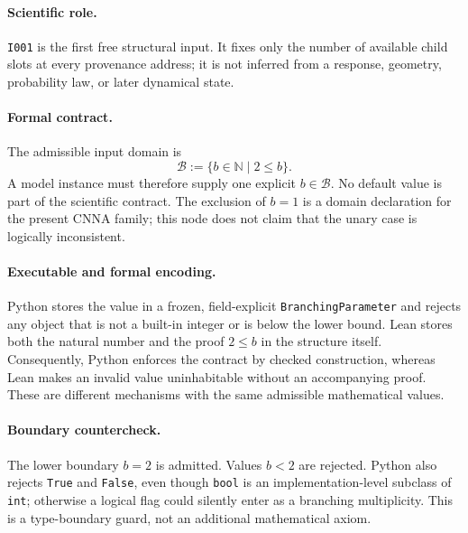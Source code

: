 
\paragraph*{Scientific role.}
\texttt{I001} is the first free structural input.  It fixes only the number of
available child slots at every provenance address; it is not inferred from a
response, geometry, probability law, or later dynamical state.

\paragraph*{Formal contract.}
The admissible input domain is
\begin{equation}
  \mathcal B := \{b\in\mathbb N \mid 2\le b\}.
  \label{eq:i001-branching-domain}
\end{equation}
A model instance must therefore supply one explicit $b\in\mathcal B$.  No
default value is part of the scientific contract.  The exclusion of $b=1$ is
a domain declaration for the present CNNA family; this node does not claim
that the unary case is logically inconsistent.

\paragraph*{Executable and formal encoding.}
Python stores the value in a frozen, field-explicit
\texttt{BranchingParameter} and rejects any object that is not a built-in
integer or is below the lower bound.  Lean stores both the natural number and
the proof $2\le b$ in the structure itself.  Consequently, Python enforces the
contract by checked construction, whereas Lean makes an invalid value
uninhabitable without an accompanying proof.  These are different mechanisms
with the same admissible mathematical values.

\paragraph*{Boundary countercheck.}
The lower boundary $b=2$ is admitted.  Values $b<2$ are rejected.  Python also
rejects \texttt{True} and \texttt{False}, even though \texttt{bool} is an
implementation-level subclass of \texttt{int}; otherwise a logical flag could
silently enter as a branching multiplicity.  This is a type-boundary guard,
not an additional mathematical axiom.


